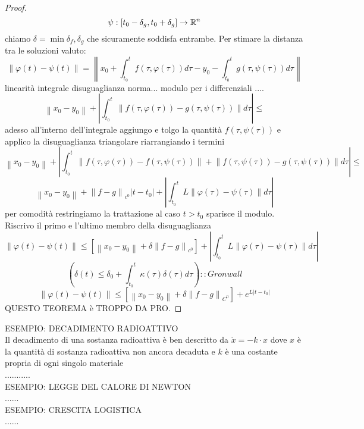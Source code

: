\begin{proof}
	$$\psi:\left[t_0-\delta_g,t_0+\delta_g\right]\to \mathbb{R}^n$$
	chiamo $\delta=\min{\delta_f,\delta_g}$ che sicuramente soddisfa entrambe. Per stimare la distanza tra le soluzioni valuto:
	$$
	\left\|\varphi(t)-\psi(t)\right\|=
	\left\|  x_0+\int_{t_0}^t f(\tau,\varphi(\tau))d\tau - y_0 - \int_{t_0}^t g(\tau,\psi(\tau))d\tau\right\|
	$$
	linearità integrale disuguaglianza norma... modulo per i differenziali ....\\
	$$ \left\| x_0-y_0\right\|+\left| \int_{t_0}^{t} \left\| f(\tau,\varphi(\tau))-g(\tau,\psi(\tau)) \right\|d\tau \right|\le$$
	adesso all'interno dell'integrale aggiungo e tolgo la quantità $f(\tau,\psi(\tau))$ e applico la disuguaglianza triangolare riarrangiando i termini
	$$ \left\| x_0-y_0\right\|+\left| \int_{t_0}^{t} \left\| f(\tau,\varphi(\tau))-f(\tau,\psi(\tau))\right\|+\left\|f(\tau,\psi(\tau))-g(\tau,\psi(\tau)) \right\|d\tau \right|\le$$
	$$ \left\| x_0-y_0\right\| + \left\| f-g\right\|_{c^0}\left|t-t_0\right| +\left| \int_{t_0}^{t} L\left\|\varphi(\tau)-\psi(\tau)\right\| d\tau \right|$$
	per comodità restringiamo la trattazione al caso $t>t_0$ sparisce il modulo. Riscrivo il primo e l'ultimo membro della disuguaglianza
	$$ \left\|\varphi(t)-\psi(t)\right\|\le  \left[ \left\| x_0-y_0\right\| + \delta\left\| f-g\right\|_{c^0}\right] +\left| \int_{t_0}^{t} L\left\|\varphi(\tau)-\psi(\tau)\right\| d\tau \right|$$
	$$ \left( \delta(t)\le\delta_0+\int_{t_0}^t \kappa(\tau)\delta(\tau)d\tau \right)::Gronwall$$
	$$ \left\| \varphi(t)-\psi(t)\right\|\le\left[\left\|x_0-y_0\right\|+\delta\left\|f-g\right\|_{C^0}\right]+e^{L\left|t-t_0\right|}$$
	QUESTO TEOREMA è TROPPO DA PRO.
\end{proof}
ESEMPIO: DECADIMENTO RADIOATTIVO\\
Il decadimento di una sostanza radioattiva è ben descritto da $\dot{x}=-k\cdot x$ dove $x$ è la quantità di sostanza radioattiva non ancora decaduta e $k$ è una costante propria di ogni singolo materiale\\
...........\\
ESEMPIO: LEGGE DEL CALORE DI NEWTON\\
......\\
ESEMPIO: CRESCITA LOGISTICA\\
......\\
